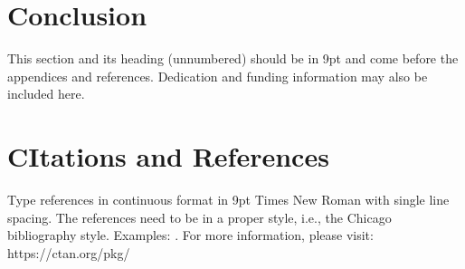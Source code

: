\documentclass[twocolumn]{rps-esrl2020}
\begin{document}
\section{Conclusion}


\begin{acknowledgement}
This section and its heading (unnumbered) should be in 9pt and come before the appendices and references.  Dedication and funding information may also be included here. 
\end{acknowledgement}

\section*{CItations and References}

Type references in continuous format in 9pt Times New Roman with single line spacing.   The references need to be in a proper style, i.e., the
Chicago bibliography style. Examples: \cite{lamport94,knuth79}. For more information, please visit: https://ctan.org/pkg/


\end{document}
